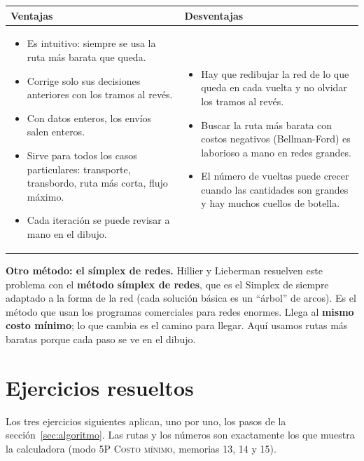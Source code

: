 \documentclass[11pt,a4paper]{article}
\begin{document}
\begin{center}\small
\begin{tabular}{p{7.2cm}p{7.2cm}}
\toprule
\textbf{Ventajas} & \textbf{Desventajas} \\
\midrule
\begin{itemize}[leftmargin=*, itemsep=2pt, topsep=2pt]
  \item Es intuitivo: siempre se usa la ruta más barata que queda.
  \item Corrige solo sus decisiones anteriores con los tramos al revés.
  \item Con datos enteros, los envíos salen enteros.
  \item Sirve para todos los casos particulares: transporte, transbordo, ruta más corta, flujo máximo.
  \item Cada iteración se puede revisar a mano en el dibujo.
\end{itemize}
&
\begin{itemize}[leftmargin=*, itemsep=2pt, topsep=2pt]
  \item Hay que redibujar la red de lo que queda en cada vuelta y no olvidar los tramos al revés.
  \item Buscar la ruta más barata con costos negativos (Bellman-Ford) es laborioso a mano en redes grandes.
  \item El número de vueltas puede crecer cuando las cantidades son grandes y hay muchos cuellos de botella.
\end{itemize}
\\
\bottomrule
\end{tabular}
\end{center}

\textbf{Otro método: el símplex de redes.} Hillier y Lieberman resuelven este problema con el \textbf{método símplex de
redes}, que es el Simplex de siempre adaptado a la forma de la red (cada solución básica es un ``árbol'' de arcos). Es
el método que usan los programas comerciales para redes enormes. Llega al \textbf{mismo costo mínimo}; lo que cambia
es el camino para llegar. Aquí usamos rutas más baratas porque cada paso se ve en el dibujo.

\part{Ejercicios resueltos}
\setcounter{section}{0}

Los tres ejercicios siguientes aplican, uno por uno, los pasos de la sección~\ref{sec:algoritmo}. Las rutas y los
números son exactamente los que muestra la calculadora (modo \textsc{5P Costo mínimo}, memorias 13, 14 y 15).
\end{document}
